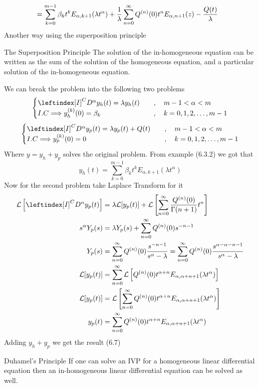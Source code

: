 \begin{example}
\begin{align*}
        \\
        &= \sum_{k=0}^{m-1} \beta_k t^{k} E_{\alpha,k+1}(\lambda t^\alpha) + \frac{1}{\lambda}\sum_{n=0}^{\infty} Q^{(n)}(0) t^{n}E_{\alpha,n+1}(z) - \frac{Q(t)}{\lambda}
        \setcounter{equation}{7}
    \end{align*}
Another way using the superposition principle
\begin{enrichment*}{The Superposition Principle}
    The solution of the in-homogeneous equation can be written as the 
    sum of the solution of the homogeneous equation, and a particular 
    solution of the in-homogeneous equation.
\end{enrichment*}
We can break the problem into the following two problems
\[
    \begin{cases}
        \leftindex[I]^C {D^{\alpha}} y_h(t) = \lambda y_h(t)  \quad&,\quad m-1<\alpha<m
        \\
        I.C \Longrightarrow y_h^{(k)}(0) = \beta_k \quad&,\quad k = 0,1,2,\dots,m-1
    \end{cases}
\]
\[
    \begin{cases}
        \leftindex[I]^C {D^{\alpha}} y_p(t) = \lambda y_p(t) + Q(t)   \quad&,\quad m-1<\alpha<m
        \\
        I.C \Longrightarrow y_p^{(k)}(0) = 0 \quad&,\quad k = 0,1,2,\dots,m-1
    \end{cases}
\]
Where $y = y_h + y_p$ solves the original problem.
From example (6.3.2) we got that
\[
    y_h(t) = \sum_{k=0}^{m-1} \beta_k t^{k} E_{\alpha,k+1}(\lambda t^\alpha)
\]
Now for the second problem take Laplace Transform for it 
\begin{align*}
    \mathcal{L}\left[\leftindex[I]^C {D^{\alpha}} y_p(t)\right] &= \lambda \mathcal{L}[y_p(t)] + \mathcal{L}\left[\sum_{n=0}^{\infty} \frac{Q^{(n)}(0)}{\Gamma(n+1)}t^n\right]
    \\
    s^{\alpha} Y_p(s) &= \lambda Y_p(s) + \sum_{n=0}^{\infty} Q^{(n)}(0) s^{-n-1} 
    \\
    Y_p(s) &= \sum_{n=0}^{\infty} Q^{(n)}(0) \frac{s^{-n-1} }{s^{\alpha}-\lambda} = \sum_{n=0}^{\infty} Q^{(n)}(0) \frac{s^{\alpha-\alpha-n-1} }{s^{\alpha}-\lambda}
    \\
    \mathcal{L}[y_p(t)] &= \sum_{n=0}^{\infty} \mathcal{L}\left[Q^{(n)}(0) t^{\alpha+n} E_{\alpha,\alpha+n+1}(\lambda t^\alpha)\right]
    \\
    \mathcal{L}[y_p(t)] &= \mathcal{L}\left[\sum_{n=0}^{\infty} Q^{(n)}(0) t^{\alpha+n} E_{\alpha,\alpha+n+1}(\lambda t^\alpha)\right]
    \\
    y_p(t) &= \sum_{n=0}^{\infty} Q^{(n)}(0) t^{\alpha+n} E_{\alpha,\alpha+n+1}(\lambda t^\alpha)
\end{align*}
Adding $y_h + y_p$ we get the result (6.7)
\end{example}
\begin{enrichment*}{Duhamel's Principle}
    If one can solve an IVP for a homogeneous linear differential equation then an in-homogeneous linear differential equation can be solved as well.
\end{enrichment*} 
\newpage
